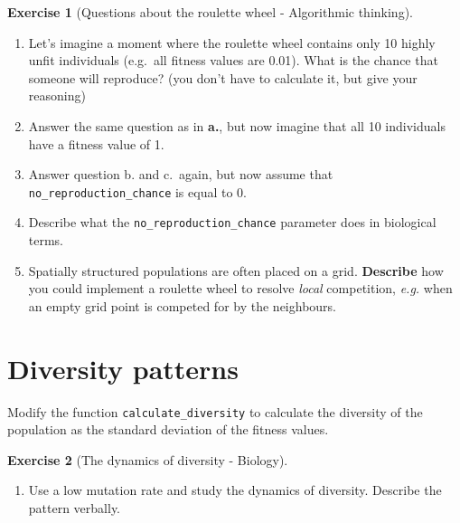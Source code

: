 \documentclass[
  letterpaper,
  DIV=11,
  numbers=noendperiod]{scrreprt}
\providecommand{\tightlist}{%
  \setlength{\itemsep}{0pt}\setlength{\parskip}{0pt}}\usepackage{longtable,booktabs,array}
\theoremstyle{definition}
\newtheorem{exercise}{Exercise}[chapter]
\theoremstyle{remark}
\begin{document}
\begin{exercise}[Questions about the roulette wheel - Algorithmic
thinking]\protect\hypertarget{exr-roulette}{}\label{exr-roulette}

\begin{enumerate}
\def\labelenumi{\alph{enumi}.}
\tightlist
\item
  Let's imagine a moment where the roulette wheel contains only 10
  highly unfit individuals (e.g.~all fitness values are 0.01). What is
  the chance that someone will reproduce? (you don't have to calculate
  it, but give your reasoning)
\item
  Answer the same question as in \textbf{a.}, but now imagine that all
  10 individuals have a fitness value of 1.
\item
  Answer question b. and c.~again, but now assume that
  \texttt{no\_reproduction\_chance} is equal to 0.
\item
  Describe what the \texttt{no\_reproduction\_chance} parameter does in
  biological terms.
\item
  Spatially structured populations are often placed on a grid.
  \textbf{Describe} how you could implement a roulette wheel to resolve
  \emph{local} competition, \emph{e.g.} when an empty grid point is
  competed for by the neighbours.
\end{enumerate}

\end{exercise}

\section{Diversity patterns}\label{diversity-patterns}

Modify the function \texttt{calculate\_diversity} to calculate the
diversity of the population as the standard deviation of the fitness
values.

\begin{exercise}[The dynamics of diversity -
Biology]\protect\hypertarget{exr-diversitydynamics}{}\label{exr-diversitydynamics}

\begin{enumerate}
\def\labelenumi{\alph{enumi}.}
\tightlist
\item
  Use a low mutation rate and study the dynamics of diversity. Describe
  the pattern verbally.
\end{enumerate}

\end{exercise}
\end{document}
